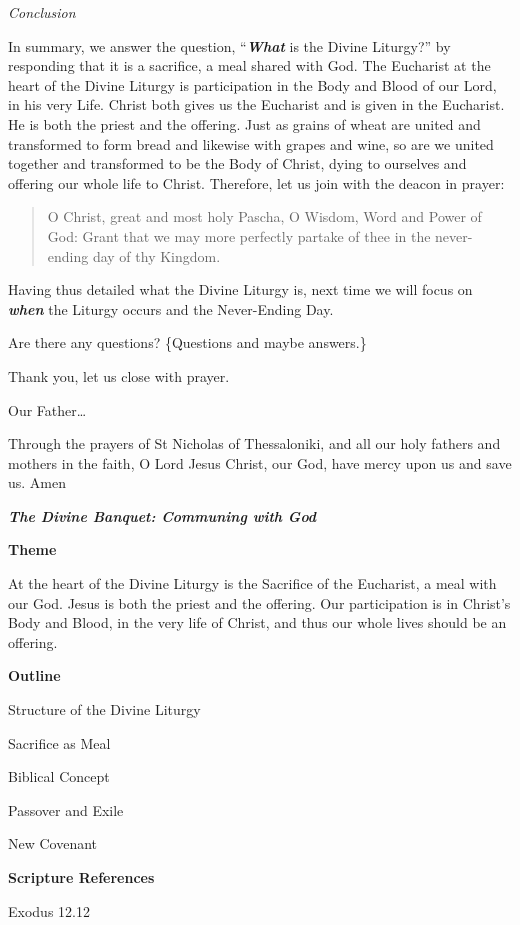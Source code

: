 \documentclass[
]{article}
\begin{document}
\emph{Conclusion}

In summary, we answer the question, ``\textbf{\emph{What}} is the Divine
Liturgy?'' by responding that it is a sacrifice, a meal shared with God.
The Eucharist at the heart of the Divine Liturgy is participation in the
Body and Blood of our Lord, in his very Life. Christ both gives us the
Eucharist and is given in the Eucharist. He is both the priest and the
offering. Just as grains of wheat are united and transformed to form
bread and likewise with grapes and wine, so are we united together and
transformed to be the Body of Christ, dying to ourselves and offering
our whole life to Christ. Therefore, let us join with the deacon in
prayer:

\begin{quote}
O Christ, great and most holy Pascha, O Wisdom, Word and Power of God:
Grant that we may more perfectly partake of thee in the never-ending day
of thy Kingdom.
\end{quote}

Having thus detailed what the Divine Liturgy is, next time we will focus
on \textbf{\emph{when}} the Liturgy occurs and the Never-Ending Day.

Are there any questions? \{Questions and maybe answers.\}

Thank you, let us close with prayer.

Our Father\ldots{}

Through the prayers of St Nicholas of Thessaloniki, and all our holy
fathers and mothers in the faith, O Lord Jesus Christ, our God, have
mercy upon us and save us. Amen

\textbf{\emph{The Divine Banquet: Communing with God}}

\textbf{Theme}

At the heart of the Divine Liturgy is the Sacrifice of the Eucharist, a
meal with our God. Jesus is both the priest and the offering. Our
participation is in Christ's Body and Blood, in the very life of Christ,
and thus our whole lives should be an offering.

\textbf{Outline}

Structure of the Divine Liturgy

Sacrifice as Meal

Biblical Concept

Passover and Exile

New Covenant

\textbf{Scripture References}

Exodus 12.12
\end{document}
